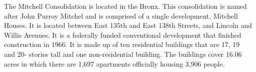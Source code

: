      

   

The Mitchell Consolidation is located in the Bronx. This consolidation is named after John Purroy Mitchel and is comprised of a single development, Mitchell Houses. It is located between East 135th and East 138th Streets, and Lincoln and Willis Avenues. It is a federally funded conventional development that finished construction in 1966. It is made up of ten residential buildings that are 17, 19 and 20- stories tall and one non-residential building. The buildings cover 16.06 acres in which there are 1,697 apartments officially housing 3,906 people. 